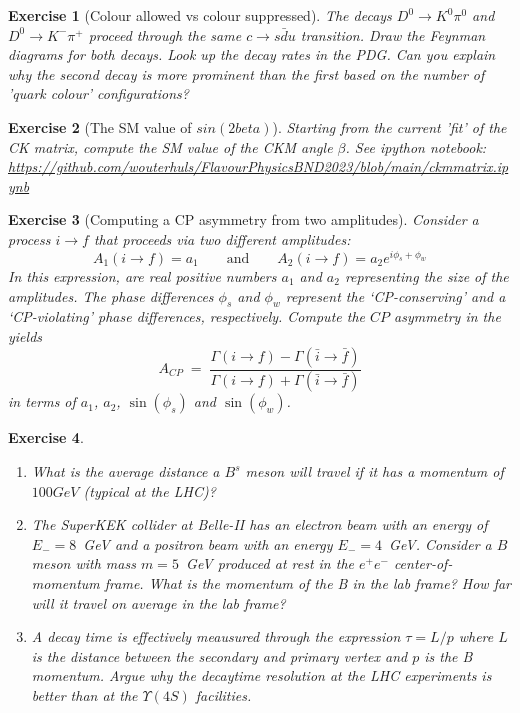 \documentclass{article}
\newcommand{\nbexercise}[1]{\url{https://github.com/wouterhuls/FlavourPhysicsBND2023/blob/main/#1}}
\newtheorem{homeworkexercise}{Exercise}
\newenvironment{enumexercise}{
  \renewcommand{\labelenumi}{\bfseries{(\alph{enumi})}}
  \leavevmode\begin{enumerate}}{\end{enumerate}\vspace{5pt}}
\begin{document}
\begin{homeworkexercise}[Colour allowed vs colour suppressed]
  The decays $D^0 \to K^0 \pi^0$ and $D^0 \to K^- \pi^+$ proceed through the same $c \to s \bar{d} u$ transition. Draw the Feynman diagrams for both decays. Look up the decay rates in the PDG. Can you explain why the second decay is more prominent than the first based on the number of 'quark colour' configurations?
\end{homeworkexercise}

\begin{homeworkexercise}[The SM value of $sin(2beta)$]
  Starting from the current 'fit' of the CK matrix, compute the SM value of the CKM angle $\beta$.
  See ipython notebook: \nbexercise{ckmmatrix.ipynb}
\end{homeworkexercise}

\begin{homeworkexercise}[Computing a CP asymmetry from two amplitudes]
  Consider a process $ i \to f $ that proceeds via two different amplitudes:
  \[
    A_1(i \to f) = a_1 \qquad \text{and} \qquad
    A_2(i \to f) = a_2 e^{i \phi_s + \phi_w}
  \]
  In this expression, are real positive numbers $a_1$ and $a_2$ representing the size of the amplitudes. The phase differences $\phi_s$ and $\phi_w$ represent the `CP-conserving' and a `CP-violating' phase differences, respectively.   Compute the $CP$ asymmetry in the yields
  \[
    A_{CP} \; = \;
    \frac{ \Gamma(i\to f) - \Gamma( \bar{i} \to \bar{f} ) }
    { \Gamma(i\to f) + \Gamma( \bar{i} \to \bar{f} ) }
  \]
  in terms of $a_1$, $a_2$, $\sin(\phi_s)$ and $\sin(\phi_w)$.
\end{homeworkexercise}



\begin{homeworkexercise}
  \begin{enumexercise}
  \item What is the average distance a $B^s$ meson will travel if it has a momentum of $100 GeV$ (typical at the LHC)?
  \item The SuperKEK collider at Belle-II has an electron beam with an energy of $E_- = 8$~GeV and a positron beam with an energy $E_- = 4$~GeV. Consider a $B$ meson with mass $m=5$~GeV produced at rest in the $e^+ e^-$ center-of-momentum frame. What is the momentum of the B in the lab frame? How far will it travel on average in the lab frame?
  \item A decay time is effectively meausured through the expression $\tau = L / p$ where $L$ is the distance between the secondary and primary vertex and $p$ is the B momentum. Argue why the decaytime resolution at the LHC experiments is better than at the $\Upsilon(4S)$ facilities.
  \end{enumexercise}
\end{homeworkexercise}
  
\end{document}
